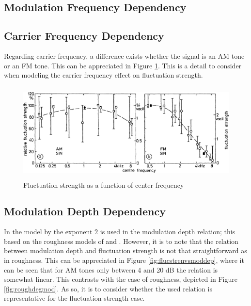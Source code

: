 \documentclass[a4paper]{article}
\begin{document}
\subsection{Modulation Frequency Dependency}

\subsection{Carrier Frequency Dependency}

Regarding carrier frequency, a difference exists whether the signal is an AM
tone or an FM tone. This can be appreciated in Figure
\ref{fig:flucstrenvscfreq}. This is a detail to consider when modeling the
carrier frequency effect on fluctuation strength.

\begin{figure}[ht]
    \centering
    \includegraphics[height=5cm]
        {book/img/Fastl2007-FluctuationStrengthVsCenterFrequency}
    \caption{Fluctuation strength as a function of center frequency
        \cite[pp. 250]{Fastl2007Psychoacoustics}}
    \label{fig:flucstrenvscfreq}
\end{figure}

\subsection{Modulation Depth Dependency}

In the model by \citet{Sontacchi1998} the exponent $2$ is used in the modulation
depth relation; this based on the roughness models of
\citet{aures1985berechnungsverfahren} and \citet{daniel1997psychoacoustical}.
However, it is to note that the relation between modulation depth and
fluctuation strength is not that straightforward as in roughness. This can be
appreciated in Figure \ref{fig:flucstrenvsmoddep}, where it can be seen that for
AM tones only between 4 and 20 dB the relation is somewhat linear. This
contrasts with the case of roughness, depicted in Figure \ref{fig:roughdegmod}.
As so, it is to consider whether the used relation is representative for the
fluctuation strength case.
\end{document}
